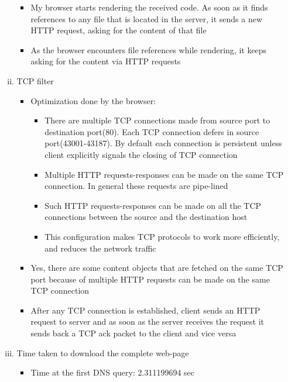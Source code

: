 \documentclass{article}
\begin{document}
\begin{enumerate}[a)]
\begin{enumerate}[i)]
\begin{itemize}
                        \item My browser starts rendering the received code. As soon as it finds references to any file that is located in the server, it sends a new HTTP request, asking for the content of that file
                        \item As the browser encounters file references while rendering, it keeps asking for the content via HTTP requests
                    \end{itemize}{}
                \item TCP filter
                    \begin{itemize}
                        \item Optimization done by the browser:
                        \begin{itemize}
                            \item There are multiple TCP connections made from source port to destination port(80). Each TCP connection defers in source port(43001-43187). By default each connection is persistent unless client explicitly signals the closing of TCP connection \item Multiple HTTP requests-responses can be made on the same TCP connection. In general these requests are pipe-lined
                            \item Such HTTP requests-responses can be made on all the TCP connections between the source and the destination host
                            \item This configuration makes TCP protocols to work more efficiently, and reduces the network traffic
                        \end{itemize}{}
                        \item Yes, there are some content objects that are fetched on the same TCP port because of multiple HTTP requests can be made on the same TCP connection
                        \item After any TCP connection is established, client sends an HTTP request to server and as soon as the server receives the request it sends back a TCP ack packet to the client and vice versa
                    \end{itemize}{}
                \item Time taken to download the complete web-page
                    \begin{itemize}
                        \item Time at the first DNS query: 2.311199694 sec

\end{itemize}
\end{enumerate}
\end{enumerate}
\end{document}

